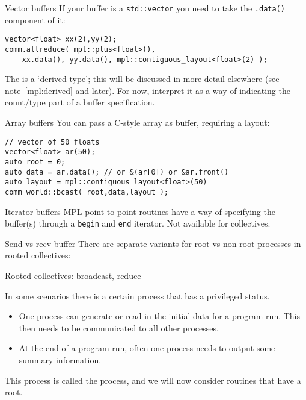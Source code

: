 \begin{mplnote}{Vector buffers}
  \label{mpl:vec-buf}
If your buffer is a \lstinline+std::vector+ you need
to take the \lstinline+.data()+ component of it:
\begin{lstlisting}
vector<float> xx(2),yy(2);
comm.allreduce( mpl::plus<float>(),
    xx.data(), yy.data(), mpl::contiguous_layout<float>(2) );
\end{lstlisting}
  The  is a `derived type';
this will be discussed in more detail elsewhere
(see note~\ref{mpl:derived} and later).
For now, interpret it as a way of indicating the count/type
part of a buffer specification.
\end{mplnote}

\begin{mplnote}{Array buffers}
  \label{mpl:vec-arr}
  You can pass a C-style array as buffer, requiring a layout:
\begin{lstlisting}
// vector of 50 floats
vector<float> ar(50);
auto root = 0;
auto data = ar.data(); // or &(ar[0]) or &ar.front()
auto layout = mpl::contiguous_layout<float>(50)
comm_world::bcast( root,data,layout );
\end{lstlisting}
\end{mplnote}

\begin{mplnote}{Iterator buffers}
  \label{mpl:buf-itr}
  MPL point-to-point routines have a way of specifying the buffer(s)
  through a \lstinline{begin} and \lstinline{end} iterator.
  Not available for collectives.
\end{mplnote}

\begin{mplnote}{Send vs recv buffer}
  There are separate variants for root vs non-root processes
  in rooted collectives:
\end{mplnote}

 {Rooted collectives: broadcast, reduce}
\label{sec:rooted}

In some scenarios there is a certain process that has a privileged status.
\begin{itemize}
\item
  One process can generate or read in the initial data for a program
  run. This then needs to be communicated to all other processes.
\item
  At the end of a program run, often
  one process needs to output some summary information.
\end{itemize}
This process is called the  process, and we will now
consider routines that have a root.

